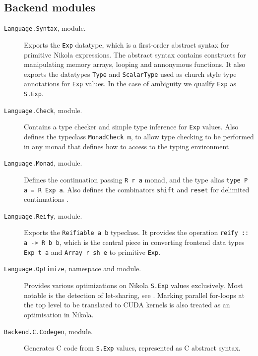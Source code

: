 \subsection*{Backend modules}
\begin{description}

  \item[\texttt{Language.Syntax}, module.] Exports the \texttt{Exp} datatype,
    which is a first-order abstract syntax for primitive Nikola expressions.
    The abstract syntax contains constructs for manipulating memory arrays,
    looping and annonymous functions. It also exports the datatypes
    \texttt{Type} and \texttt{ScalarType} used as church style type annotations
    for \texttt{Exp} values. In the case of ambiguity we quailfy \texttt{Exp}
    as \texttt{S.Exp}.

  \item[\texttt{Language.Check}, module.] Contains a type checker and simple type
    inference for \texttt{Exp} values. Also defines the typeclass
    \texttt{MonadCheck m}, to allow type checking to be performed in any monad
    that defines how to access to the typing environment

  \item[\texttt{Language.Monad}, module.] Defines the continuation passing
    \texttt{R r a} monad, and the type alias \texttt{type P a = R Exp a}.
    Also defines the combinators \texttt{shift} and \texttt{reset} for
    delimited continuations \cite{wadler1994monads}.

  \item[\texttt{Language.Reify}, module.] Exports the \texttt{Reifiable a b}
    typeclass. It provides the operation \texttt{reify :: a -> R b b},
    which is the central piece in converting frontend data types
    \texttt{Exp t a} and \texttt{Array r sh e} to primitive \texttt{Exp}.

  \item[\texttt{Language.Optimize}, namespace and module.] Provides various
    optimizations on Nikola \texttt{S.Exp} values exclusively. Most notable is
    the detection of let-sharing, see \cite{mainland2010nikola}. Marking
    parallel for-loops at the top level to be translated to CUDA kernels is
    also treated as an optimisation in Nikola.

  \item[\texttt{Backend.C.Codegen}, module.] Generates C code from
    \texttt{S.Exp} values, represented as C abstract syntax.

\end{description}

